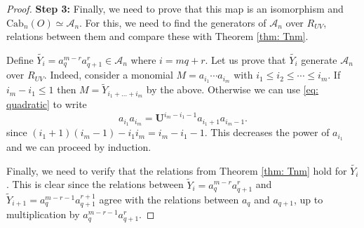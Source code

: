 \documentclass[10pt,a4paper]{amsart}
\newcommand{\CA}{\mathcal{A}}
\newcommand{\Cab}{\mathrm{Cab}}
\newcommand{\UU}{\mathbf{U}}
\begin{document}
\begin{proof}
{\bf Step 3:} Finally, we need to prove that this map is an isomorphism and $\Cab_n(O)\simeq \CA_n$. For this, we need to find the generators of $\CA_n$ over $R_{UV}$, relations between them and compare these with Theorem \ref{thm: Tnm}. 

Define $\widetilde{Y_i}=a_{q}^{m-r}a_{q+1}^{r}\in \CA_n$ where $i=mq+r$. Let us prove that $\widetilde{Y_i}$ generate $\CA_n$ over $R_{UV}$. Indeed, consider a monomial $M=a_{i_1}\cdots a_{i_m}$ with $i_1\le i_2\le \cdots \le i_m$. If $i_m-i_1\le 1$ then $M=\widetilde{Y}_{i_1+\ldots+i_m}$ by the above. Otherwise we can use \eqref{eq: quadratic} to write
$$
a_{i_1}a_{i_m}=\UU^{i_m-i_1-1}a_{i_1+1}a_{i_m-1}.
$$ 
since $(i_1+1)(i_m-1)-i_1i_m=i_m-i_1-1$.
This decreases the power of $a_{i_1}$ and we can proceed by induction.

Finally, we need to verify that the relations from Theorem \ref{thm: Tnm}  hold for $\widetilde{Y_i}$. This is clear since the relations between
$\widetilde{Y}_i=a_{q}^{m-r}a_{q+1}^{r}$ and $\widetilde{Y}_{i+1}=a_{q}^{m-r-1}a_{q+1}^{r+1}$ agree with the relations between $a_{q}$ and $a_{q+1}$,
up to multiplication by $a_{q}^{m-r-1}a_{q+1}^{r}$. 
\end{proof}
\end{document}
